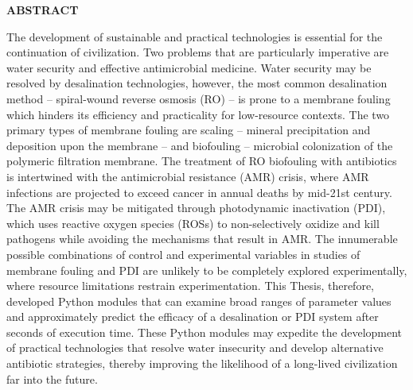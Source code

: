 \newpage
{}


\begin{center}
    \textbf{ABSTRACT}
\end{center}
\begin{justify}
    The development of sustainable and practical technologies is essential for the continuation of civilization. Two problems that are particularly imperative are water security and effective antimicrobial medicine. Water security may be resolved by desalination technologies, however, the most common desalination method -- spiral-wound reverse osmosis (RO) -- is prone to a membrane fouling which hinders its efficiency and practicality for low-resource contexts. The two primary types of membrane fouling are scaling -- mineral precipitation and deposition upon the membrane -- and biofouling -- microbial colonization of the polymeric filtration membrane. The treatment of RO biofouling with antibiotics is intertwined with the antimicrobial resistance (AMR) crisis, where AMR infections are projected to exceed cancer in annual deaths by mid-21st century. The AMR crisis may be mitigated through photodynamic inactivation (PDI), which uses reactive oxygen species (ROSs) to non-selectively oxidize and kill pathogens while avoiding the mechanisms that result in AMR. The innumerable possible combinations of control and experimental variables in studies of membrane fouling and PDI are unlikely to be completely explored experimentally, where resource limitations restrain experimentation. This Thesis, therefore, developed Python modules that can examine broad ranges of parameter values and approximately predict the efficacy of a desalination or PDI system after seconds of execution time. These Python modules may expedite the development of practical technologies that resolve water insecurity and develop alternative antibiotic strategies, thereby improving the likelihood of a long-lived civilization far into the future. 
\end{justify}

\tableofcontents
{}\listoftables
\setcounter{lofdepth}{2}
\listoffigures


\newpage
\pagestyle{myheadings}

